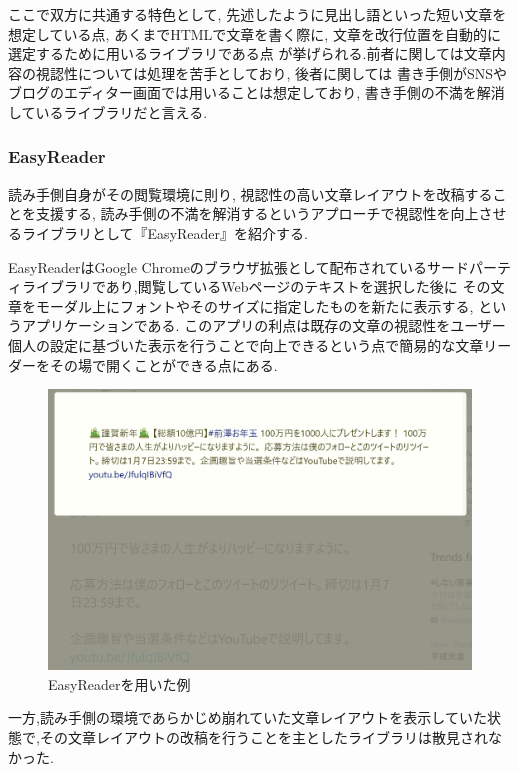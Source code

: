 ここで双方に共通する特色として, 先述したように見出し語といった短い文章を想定している点, 
あくまでHTMLで文章を書く際に, 文章を改行位置を自動的に選定するために用いるライブラリである点
が挙げられる.前者に関しては文章内容の視認性については処理を苦手としており, 後者に関しては
書き手側がSNSやブログのエディター画面では用いることは想定しており, 
書き手側の不満を解消しているライブラリだと言える.

\subsubsection{EasyReader}
読み手側自身がその閲覧環境に則り, 視認性の高い文章レイアウトを改稿することを支援する, 
読み手側の不満を解消するというアプローチで視認性を向上させるライブラリとして『EasyReader』\footnotemark[4]
を紹介する.


EasyReaderはGoogle Chromeのブラウザ拡張として配布されているサードパーティライブラリであり,閲覧しているWebページのテキストを選択した後に
その文章をモーダル上にフォントやそのサイズに指定したものを新たに表示する, というアプリケーションである.
このアプリの利点は既存の文章の視認性をユーザー個人の設定に基づいた表示を行うことで向上できるという点で簡易的な文章リーダーをその場で開くことができる点にある.

\begin{figure}[H]
    \centering
    \label{fig:image_5}
    \includegraphics[width=0.6\columnwidth]{image/02/img_5.png}
    \caption[EasyReaderを用いた例]{EasyReaderを用いた例}
\end{figure}

一方,読み手側の環境であらかじめ崩れていた文章レイアウトを表示していた状態で,その文章レイアウトの改稿を行うことを主としたライブラリは散見されなかった.



